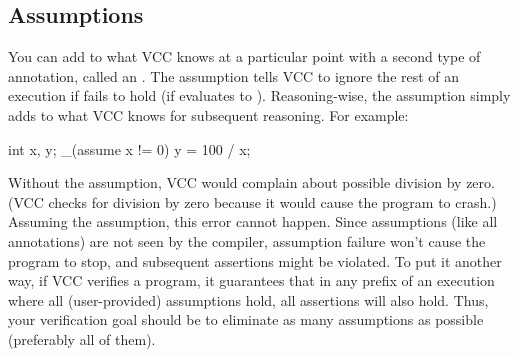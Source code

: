 \subsection{Assumptions}

You can add to what VCC knows at a particular point with a second
type of annotation, called an .
The assumption  tells VCC to ignore
the rest of an execution if  fails to hold (\ie if
 evaluates to ). 
Reasoning-wise, the assumption simply adds  to what VCC
knows for subsequent reasoning. For example:
\begin{VCC}
int x, y;
_(assume x != 0)
y = 100 / x;
\end{VCC}
Without the assumption, VCC would complain about possible division by
zero. (VCC checks for division by zero because it would cause the
program to crash.)  Assuming the assumption, this error cannot happen.  
Since assumptions (like all annotations) are not seen by the compiler,
assumption failure won't cause the program to stop, and subsequent assertions
might be violated. To put it another way, if VCC verifies a program,
it guarantees that in any prefix of an execution
where all (user-provided) assumptions hold, all assertions will also
hold. Thus, your verification goal should be to eliminate as many assumptions as
possible (preferably all of them).

